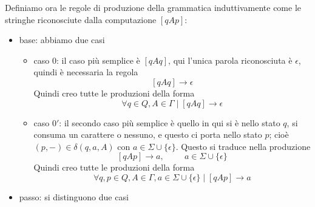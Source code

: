 \documentclass[12pt]{report}
\begin{document}
Definiamo ora le regole di produzione della grammatica induttivamente come le stringhe riconosciute dalla computazione $[qAp]$:
\begin{itemize}
	\item base: abbiamo due casi
		\begin{itemize}
			\item caso $0$: il caso più semplice è $[qAq]$, qui l'unica parola riconosciuta è $\epsilon$, quindi è necessaria la regola
				$$ [qAq] \rightarrow \epsilon $$
				Quindi creo tutte le produzioni della forma
				$$ \forall q \in Q, A \in \Gamma \mid [qAq] \rightarrow \epsilon $$	%
			\item caso $0'$: il secondo caso più semplice è quello in qui si è nello stato $q$, si consuma un carattere o nessuno, e questo ci porta nello stato $p$; cioè $(p, -) \in \delta(q, a, A)$ con $a \in \Sigma \cup \{\epsilon\}$.
				Questo si traduce nella produzione
				$$ [qAp] \rightarrow a, \hspace{1cm} a \in \Sigma \cup \{\epsilon\} $$
				Quindi creo tutte le produzioni della forma
				$$ \forall q, p \in Q, A \in \Gamma, a \in \Sigma \cup \{\epsilon\} \mid [qAp] \rightarrow a $$
		\end{itemize}
	\item passo: si distinguono due casi
		\begin{figure}[H]
			\centering
			\begin{subfigure}{0.45\textwidth}
				\centering
\end{subfigure}
\end{figure}
\end{itemize}
\end{document}
